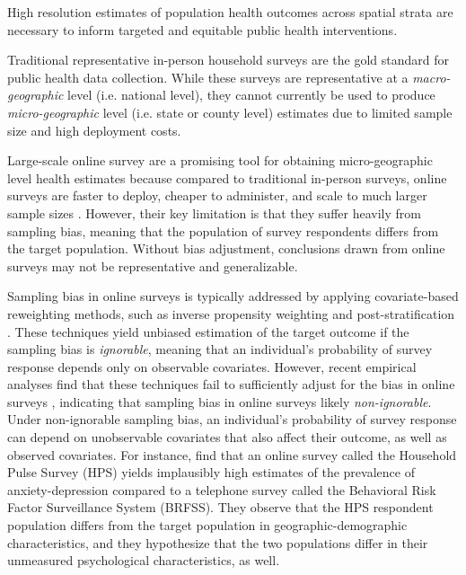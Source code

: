 




High resolution estimates of population health outcomes across spatial strata are necessary to inform targeted and equitable public health interventions. 

Traditional representative in-person household surveys are the gold standard for public health data collection. While these surveys are representative at a \textit{macro-geographic} level (i.e. national level), they cannot currently be used to produce \textit{micro-geographic} level (i.e. state or county level) estimates due to limited sample size and high deployment costs.

Large-scale online survey are a promising tool for obtaining micro-geographic level health estimates \citep{geldsetzer2020use, us2021measuring, salomon2021us} because compared to traditional in-person surveys, online surveys are faster to deploy, cheaper to administer, and scale to much larger sample sizes \citep{blumberg2021national}. However, their key limitation is that they suffer heavily from sampling bias, meaning that the population of survey respondents differs from the target population. Without bias adjustment, conclusions drawn from online surveys may not be representative and generalizable.

Sampling bias in online surveys is typically addressed by applying covariate-based reweighting methods, such as inverse propensity weighting and post-stratification \citep{ groves2011survey, rosenbaum1983central}. These techniques yield unbiased estimation of the target outcome if the sampling bias is \textit{ignorable}, meaning that an individual's probability of survey response depends only on observable covariates. However, recent empirical analyses find that these techniques fail to sufficiently adjust for the bias in online surveys \citep{bradley2021unrepresentative, kessler2022estimated}, indicating that sampling bias in online surveys likely \textit{non-ignorable}. Under non-ignorable sampling bias, an individual's probability of survey response can depend on unobservable covariates that also affect their outcome, as well as observed covariates. For instance, \citet{kessler2022estimated} find that an online survey called the Household Pulse Survey (HPS) yields implausibly high estimates of the prevalence of anxiety-depression compared to a telephone survey called the Behavioral Risk Factor Surveillance System (BRFSS). They observe that the HPS respondent population differs from the target population in geographic-demographic characteristics, and they hypothesize that the two populations differ in their unmeasured psychological characteristics, as well.

